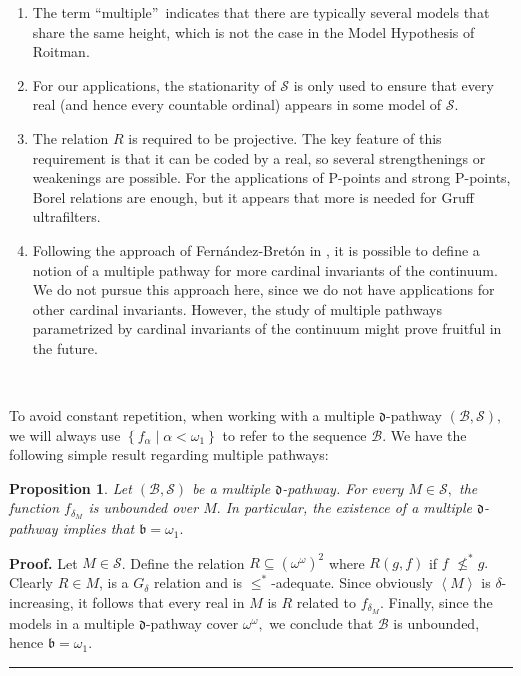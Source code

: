 \documentclass{article}%
\newtheorem{proposition}[theorem]{Proposition}
\newenvironment{proof}[1][Proof]{\noindent\textbf{#1.} }{\ \rule{0.5em}{0.5em}}
\begin{document}
\begin{enumerate}
\item The term \textquotedblleft multiple\textquotedblright\ indicates that
there are typically several models that share the same height, which is not
the case in the Model Hypothesis of Roitman.

\item For our applications, the stationarity of $\mathcal{S}$ is only used to
ensure that every real (and hence every countable ordinal) appears in some
model of $\mathcal{S}.$

\item The relation $R$ is required to be projective. The key feature of this
requirement is that it can be coded by a real, so several strengthenings or
weakenings are possible. For the applications of \textsf{P}-points and strong
\textsf{P}-points, Borel relations are enough, but it appears that more is
needed for Gruff ultrafilters.

\item Following the approach of Fern\'{a}ndez-Bret\'{o}n in
\cite{GeneralizedPathways}, it is possible to define a notion of a multiple
pathway for more cardinal invariants of the continuum. We do not pursue this
approach here, since we do not have applications for other cardinal
invariants. However, the study of multiple pathways parametrized by cardinal
invariants of the continuum might prove fruitful in the future.
\end{enumerate}

\qquad\qquad\qquad\ \ \ 

To avoid constant repetition, when working with a multiple $\mathfrak{d}%
$-pathway $\left(  \mathcal{B},\mathcal{S}\right)  ,$ we will always use
$\left\{  f_{\alpha}\mid\alpha<\omega_{1}\right\}  $ to refer to the sequence
$\mathcal{B}$. We have the following simple result regarding multiple pathways:

\begin{proposition}
Let $\left(  \mathcal{B},\mathcal{S}\right)  $ be a multiple $\mathfrak{d}%
$-pathway. For every $M\in\mathcal{S},$ the function $f_{\delta_{M}}$ is
unbounded over $M.$ In particular, the existence of a multiple $\mathfrak{d}%
$-pathway implies that $\mathfrak{b}=\omega_{1}.$ \label{Escala}
\end{proposition}

\begin{proof}
Let $M\in\mathcal{S}$. Define the relation $R\subseteq\left(  \omega^{\omega
}\right)  ^{2}$ where $R\left(  g,f\right)  $ if $f$ $\nleq^{\ast}g.$ Clearly
$R\in M$, is a $G_{\delta}$ relation and is $\leq^{\ast}$-adequate. Since
obviously $\left\langle M\right\rangle $ is $\delta$-increasing, it follows
that every real in $M$ is $R$ related to $f_{\delta_{M}}.$ Finally, since the
models in a multiple $\mathfrak{d}$-pathway cover $\omega^{\omega},$ we
conclude that $\mathcal{B}$ is unbounded, hence $\mathfrak{b}=\omega_{1}.$
\end{proof}
\end{document}
